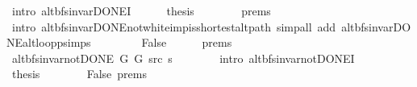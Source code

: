 \begin{isabellebody}
\ {\isacharparenleft}{\kern0pt}intro\ alt{\isacharunderscore}{\kern0pt}bfs{\isacharunderscore}{\kern0pt}invar{\isacharunderscore}{\kern0pt}DONE{\isacharprime}{\kern0pt}I{\isacharparenright}{\kern0pt}\isanewline
\ \ \ \ \isamarkupfalse%
\ {\isacharquery}{\kern0pt}thesis\isanewline
\ \ \ \ \ \ \isamarkupfalse%
\ {\isachardoublequoteopen}{}{\isachardot}{\kern0pt}prems{\isachardoublequoteclose}{\isacharparenleft}{\kern0pt}{}{\isacharparenright}{\kern0pt}\isanewline
\ \ \ \ \ \ \isamarkupfalse%
\ {\isacharparenleft}{\kern0pt}intro\ alt{\isacharunderscore}{\kern0pt}bfs{\isacharunderscore}{\kern0pt}invar{\isacharunderscore}{\kern0pt}DONE{\isachardot}{\kern0pt}not{\isacharunderscore}{\kern0pt}white{\isacharunderscore}{\kern0pt}imp{\isacharunderscore}{\kern0pt}is{\isacharunderscore}{\kern0pt}shortest{\isacharunderscore}{\kern0pt}alt{\isacharunderscore}{\kern0pt}path{\isacharparenright}{\kern0pt}\ {\isacharparenleft}{\kern0pt}simp{\isacharunderscore}{\kern0pt}all\ add{\isacharcolon}{\kern0pt}\ alt{\isacharunderscore}{\kern0pt}bfs{\isacharunderscore}{\kern0pt}invar{\isacharunderscore}{\kern0pt}DONE{\isachardot}{\kern0pt}alt{\isacharunderscore}{\kern0pt}loop{\isacharunderscore}{\kern0pt}psimps{\isacharparenright}{\kern0pt}\isanewline
\ \ \isamarkupfalse%
\isanewline
\ \ \ \ \isamarkupfalse%
\ False\isanewline
\ \ \ \ \isamarkupfalse%
\ {\isachardoublequoteopen}{}{\isachardot}{\kern0pt}prems{\isachardoublequoteclose}{\isacharparenleft}{\kern0pt}{}{\isacharparenright}{\kern0pt}\isanewline
\ \ \ \ \isamarkupfalse%
\ {\isachardoublequoteopen}alt{\isacharunderscore}{\kern0pt}bfs{\isacharunderscore}{\kern0pt}invar{\isacharunderscore}{\kern0pt}not{\isacharunderscore}{\kern0pt}DONE{\isacharprime}{\kern0pt}\ G{}\ G{}\ src\ s{\isachardoublequoteclose}\isanewline
\ \ \ \ \ \ \isamarkupfalse%
\ {\isacharparenleft}{\kern0pt}intro\ alt{\isacharunderscore}{\kern0pt}bfs{\isacharunderscore}{\kern0pt}invar{\isacharunderscore}{\kern0pt}not{\isacharunderscore}{\kern0pt}DONE{\isacharprime}{\kern0pt}I{\isacharparenright}{\kern0pt}\isanewline
\ \ \ \ \isamarkupfalse%
\ {\isacharquery}{\kern0pt}thesis\isanewline
\ \ \ \ \ \ \isamarkupfalse%
\ False\ {\isachardoublequoteopen}{}{\isachardot}{\kern0pt}prems{\isachardoublequoteclose}{\isacharparenleft}{\kern0pt}{}{\isacharparenright}{\kern0pt}\isanewline
\ \ \ \ \ \ \isamarkupfalse%

\end{isabellebody}
